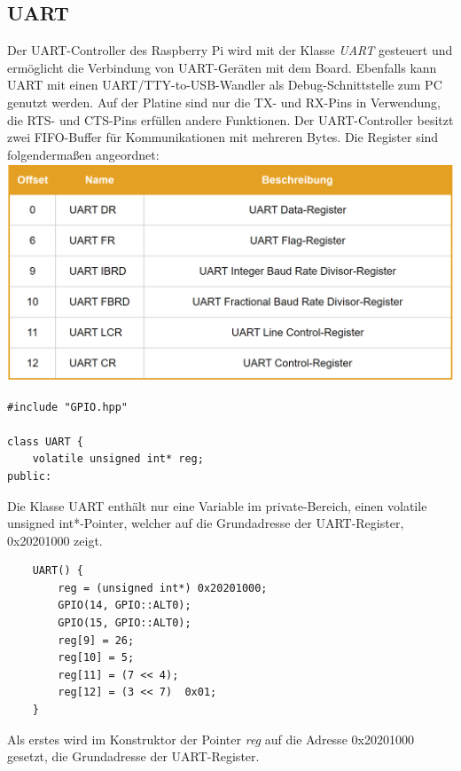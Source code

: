\documentclass[12pt]{article}
\begin{document}
\subsection{UART} 
Der UART-Controller des Raspberry Pi wird mit der Klasse \textit{UART} gesteuert und ermöglicht die Verbindung von UART-Geräten mit dem Board. Ebenfalls kann UART mit einen UART/TTY-to-USB-Wandler als Debug-Schnittstelle zum PC genutzt werden. Auf der Platine sind nur die TX- und RX-Pins in Verwendung, die RTS- und CTS-Pins erfüllen andere Funktionen. Der UART-Controller besitzt zwei FIFO-Buffer für Kommunikationen mit mehreren Bytes. Die Register sind folgendermaßen angeordnet:\\
\includegraphics[width=\textwidth]{img/uart_table.png}
\begin{center}\end{center}
\begin{verbatim}
#include "GPIO.hpp"

class UART {
    volatile unsigned int* reg;
public:
\end{verbatim}
\vspace{-2mm}
Die Klasse UART enthält nur eine Variable im private-Bereich, einen volatile unsigned int*-Pointer, welcher auf die Grundadresse der UART-Register, 0x20201000 zeigt.\\
\begin{verbatim}
    UART() {
        reg = (unsigned int*) 0x20201000;
        GPIO(14, GPIO::ALT0);
        GPIO(15, GPIO::ALT0);
        reg[9] = 26;
        reg[10] = 5; 
        reg[11] = (7 << 4);
        reg[12] = (3 << 7)  0x01;
    }
\end{verbatim}
\vspace{-2mm}
 Als erstes wird im Konstruktor der Pointer \textit{reg} auf die Adresse 0x20201000 gesetzt, die Grundadresse der UART-Register.\\
\end{document}
